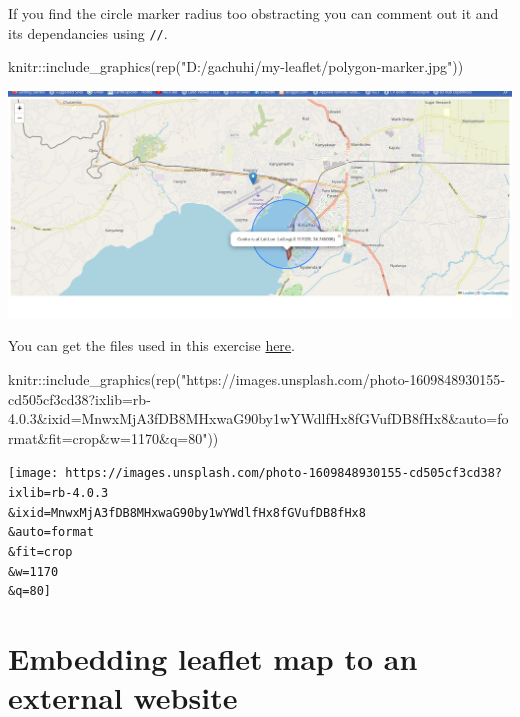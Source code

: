 \documentclass[
]{book}
\newenvironment{Shaded}{\begin{snugshade}}{\end{snugshade}}
\newcommand{\FunctionTok}[1]{\textcolor[rgb]{0.00,0.00,0.00}{#1}}
\newcommand{\NormalTok}[1]{#1}
\newcommand{\SpecialCharTok}[1]{\textcolor[rgb]{0.00,0.00,0.00}{#1}}
\newcommand{\StringTok}[1]{\textcolor[rgb]{0.31,0.60,0.02}{#1}}
\theoremstyle{definition}
\theoremstyle{definition}
\theoremstyle{definition}
\theoremstyle{definition}
\theoremstyle{remark}
\begin{document}
If you find the circle marker radius too obstracting you can comment out it and its dependancies using \texttt{//}.

\begin{Shaded}
\begin{Highlighting}[]
\NormalTok{knitr}\SpecialCharTok{::}\FunctionTok{include\_graphics}\NormalTok{(}\FunctionTok{rep}\NormalTok{(}\StringTok{"D:/gachuhi/my{-}leaflet/polygon{-}marker.jpg"}\NormalTok{))}
\end{Highlighting}
\end{Shaded}

\includegraphics[width=26.67in]{../polygon-marker}

You can get the files used in this exercise \href{https://www.dropbox.com/scl/fo/qznia963vaq8s4ca51p51/h?dl=0\&rlkey=glj4ew599c4v9fikq11wn1fje}{here}.

\begin{Shaded}
\begin{Highlighting}[]
\NormalTok{knitr}\SpecialCharTok{::}\FunctionTok{include\_graphics}\NormalTok{(}\FunctionTok{rep}\NormalTok{(}\StringTok{"https://images.unsplash.com/photo{-}1609848930155{-}cd505cf3cd38?ixlib=rb{-}4.0.3\&ixid=MnwxMjA3fDB8MHxwaG90by1wYWdlfHx8fGVufDB8fHx8\&auto=format\&fit=crop\&w=1170\&q=80"}\NormalTok{))}
\end{Highlighting}
\end{Shaded}

\texttt{[image: https://images.unsplash.com/photo-1609848930155-cd505cf3cd38?ixlib=rb-4.0.3\\\&ixid=MnwxMjA3fDB8MHxwaG90by1wYWdlfHx8fGVufDB8fHx8\\\&auto=format\\\&fit=crop\\\&w=1170\\\&q=80]}

\hypertarget{embedding-leaflet-map-to-an-external-website}{%
\chapter{Embedding leaflet map to an external website}\label{embedding-leaflet-map-to-an-external-website}}
\end{document}

